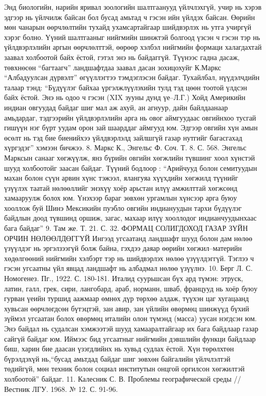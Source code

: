 Энд биологийн, нарийн яривал зоологийн шалтгаанууд үйлчлэхгүй, учир нь хэрэв эдгээр нь үйлчилж байсан бол бусад амьтад ч гэсэн ийн үйлдэх байсан. Өөрийн мөн чанарын өөрчлөлтийн тухайд ухамсартайгаар шийдвэрлэх нь утга учиргүй хэрэг болно. Үүний шалтгааныг нийгмийн шинжтэй болгоод үзсэн ч гэсэн тэр нь үйлдвэрлэлийн аргын өөрчлөлттэй, өөрөөр хэлбэл нийгмийн формаци халагдахтай заавал холбоотой байх ёстой, гэтэл энэ нь байдаггүй. Түүнээс гадна дасаж, төвхнөсөн “багтаагч” ландшафтдаа заавал дасан зохицохуйг К.Маркс “Албадуулсан дүрвэлт” өгүүллэгтээ тэмдэглэсэн байдаг. Тухайлбал, нүүдэлчдийн талаар тэнд: “Бүдүүлэг байхаа үргэлжлүүлэхийн тулд тэд цөөн тоотой үлдсэн байх ёстой. Энэ нь одоо ч гэсэн (XIX зууны дунд үе–Л.Г.) Хойд Америкийн индиан овгуудад байдаг шиг мал аж ахуй, ан агнуур, дайн байлдаанаар амьдардаг, тэдгээрийн үйлдвэрлэлийн арга нь овог аймгуудаас овгийнхоо тусгай гишүүн нэг бүрт уудам орон зай шаарддаг аймгууд юм. Эдгээр овгийн хүн амын өсөлт нь тэд бие биенийхээ үйлдвэрлэлд зайлшгүй газар нутгийг багасгахад хүргэдэг” хэмээн бичжээ. 8. Маркс К., Энгельс Ф. Соч. Т. 8. С. 568.
Энгельс Марксын санааг хөгжүүлж, янз бүрийн овгийн хөгжлийн түвшинг хоол хүнстэй шууд холбоотойг заасан байдаг. Түүний бодлоор : “Арийчууд болон семитуудын махан болон сүүн арвин хүнс тэжээл, ялангуяа хүүхдийн хөгжилд түүнийг үзүүлэх таатай нөлөөллийг энэхүү хоёр арьстан илүү амжилттай хөгжсөнд хамааруулж болох юм. Үнэхээр бараг зөвхөн ургамлын хүнсээр арга буюу хооллож буй Шинэ Мексикийн пуэбло овгийн индиануудын тархи бүдүүлэг байдлын доод түвшинд оршиж, загас, махаар илүү хооллодог индианчуудынхаас бага байдаг” 9. Там же. Т. 21. С. 32.
ФОРМАЦ СОЛИГДОХОД ГАЗАР ЗҮЙН ОРЧИН НӨЛӨӨЛДӨГГҮЙ
Ингээд угсаатанд ландшафт шууд болон дам нөлөө үзүүлдэг нь эргэлзээгүй болж байна, гэхдээ даяар өөрийн хөгжил–материйн хөдөлгөөний нийгмийн хэлбэрт тэр нь шийдвэрлэх нөлөө үзүүлдэггүй. Тэглээ ч гэсэн угсаатны үйл явцад ландшафт нь албадмал нөлөө үзүүлнэ. 10. Берг Л. С. Номогенез. Пг., 1922. С. 180-181.
Италид суурьшсан бүх ард түмэн: этруск, латин, галл, грек, сири, лангобард, араб, норманн, шваб, францууд нь хоёр буюу гурван үеийн туршид аажмаар өмнөх дүр төрхөө алдаж, түүхэн цаг хугацаанд хувьсан өөрчлөгдсөн бүтэцтэй, зан авир, зан үйлийн өвөрмөц шинжүүд бүхий зүймэл угсаатан болох өвөрмөц италийн олон түмэнд (масса) уусан нэгдсэн юм. Энэ байдал нь судалсан хэмжээтэй шууд хамааралтайгаар их бага байдлаар газар сайгүй байдаг юм. Иймээс бид угсаатныг нийгмийн дэвшлийн функци байдлаар биш, харин бие даасан үзэгдлийнх нь хувьд судлах ёстой.
Хүн төрөлхтөн бүрэлдэхүй нь,“бусад амьтдад байдаг шиг зөвхөн байгалийн үйлчлэлтэй төдийгүй, мөн техник болон социал институтын онцгой оргилсон хөгжилтэй холбоотой” байдаг. 11. Калесник С. В. Проблемы географической среды //Вестник ЛГУ. 1968. № 12. С. 91-96.
